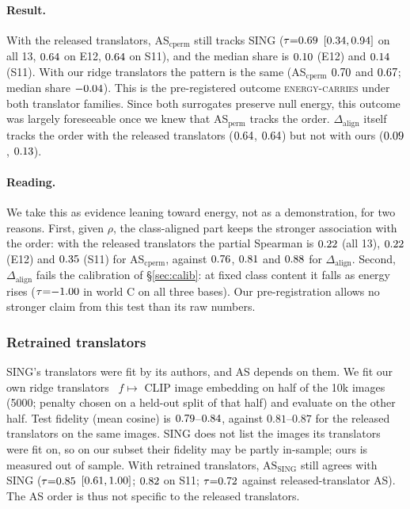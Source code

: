 \documentclass[10pt]{article}
\newcommand{\ASS}{\mathrm{AS}_{\mathrm{SING}}}
\begin{document}
\paragraph{Result.} With the released translators, AS$_{\mathrm{cperm}}$ still tracks SING ($\tau{=}0.69$ $[0.34,0.94]$ on all 13, $0.64$ on E12, $0.64$ on S11), and the median share is $0.10$ (E12) and $0.14$ (S11).
With our ridge translators the pattern is the same (AS$_{\mathrm{cperm}}$ $0.70$ and $0.67$; median share $-0.04$).
This is the pre-registered outcome \textsc{energy-carries} under both translator families.
Since both surrogates preserve null energy, this outcome was largely foreseeable once we knew that AS$_{\mathrm{perm}}$ tracks the order.
$\Delta_{\mathrm{align}}$ itself tracks the order with the released translators ($0.64$, $0.64$) but not with ours ($0.09$, $0.13$).

\paragraph{Reading.} We take this as evidence leaning toward energy, not as a demonstration, for two reasons.
First, given $\rho$, the class-aligned part keeps the stronger association with the order: with the released translators the partial Spearman is $0.22$ (all 13), $0.22$ (E12) and $0.35$ (S11) for AS$_{\mathrm{cperm}}$, against $0.76$, $0.81$ and $0.88$ for $\Delta_{\mathrm{align}}$.
Second, $\Delta_{\mathrm{align}}$ fails the calibration of \S\ref{sec:calib}: at fixed class content it falls as energy rises ($\tau{=}{-1.00}$ in world C on all three bases).
Our pre-registration allows no stronger claim from this test than its raw numbers.

\subsubsection{Retrained translators}
\label{sec:retrain}
SING's translators were fit by its authors, and AS depends on them.
We fit our own ridge translators~\citep[\S3.4]{hastie2009esl} $f\mapsto$ CLIP image embedding on half of the 10k images (5000; penalty chosen on a held-out split of that half) and evaluate on the other half.
Test fidelity (mean cosine) is $0.79$--$0.84$, against $0.81$--$0.87$ for the released translators on the same images.
SING does not list the images its translators were fit on, so on our subset their fidelity may be partly in-sample; ours is measured out of sample.
With retrained translators, $\ASS$ still agrees with SING ($\tau{=}0.85$ $[0.61,1.00]$; $0.82$ on S11; $\tau{=}0.72$ against released-translator AS).
The AS order is thus not specific to the released translators.
\end{document}
